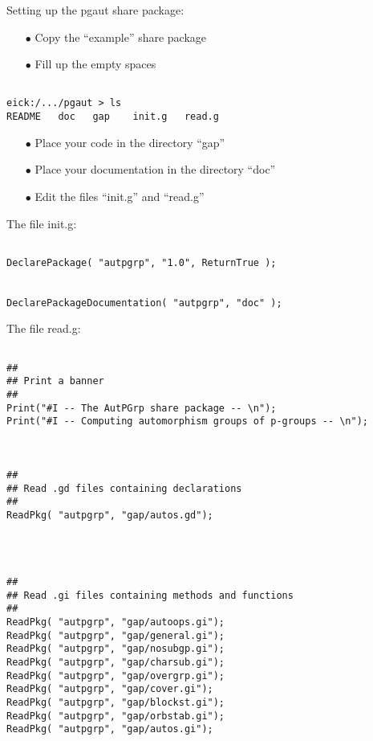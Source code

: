 \documentclass{slides}
\begin{document}
Setting up the pgaut share package: \\

\begin{itemize}
\item[$\bullet$] Copy the ``example'' share package
\item[$\bullet$] Fill up the empty spaces
\end{itemize}

{\tiny \begin{verbatim}

eick:/.../pgaut > ls
README   doc   gap    init.g   read.g

\end{verbatim}}

\begin{itemize}
\item[$\bullet$] Place your code in the directory ``gap''
\item[$\bullet$] Place your documentation in the directory ``doc''
\item[$\bullet$] Edit the files ``init.g'' and ``read.g''
\end{itemize}
\newpage

The file init.g: \\

{\tiny \begin{verbatim}

DeclarePackage( "autpgrp", "1.0", ReturnTrue );


DeclarePackageDocumentation( "autpgrp", "doc" );

\end{verbatim}}
\newpage

The file read.g: \\

{\tiny \begin{verbatim}

##
## Print a banner
##
Print("#I -- The AutPGrp share package -- \n");
Print("#I -- Computing automorphism groups of p-groups -- \n");



##
## Read .gd files containing declarations
##
ReadPkg( "autpgrp", "gap/autos.gd");




##
## Read .gi files containing methods and functions
##
ReadPkg( "autpgrp", "gap/autoops.gi");
ReadPkg( "autpgrp", "gap/general.gi");
ReadPkg( "autpgrp", "gap/nosubgp.gi");
ReadPkg( "autpgrp", "gap/charsub.gi");
ReadPkg( "autpgrp", "gap/overgrp.gi");
ReadPkg( "autpgrp", "gap/cover.gi");
ReadPkg( "autpgrp", "gap/blockst.gi");
ReadPkg( "autpgrp", "gap/orbstab.gi");
ReadPkg( "autpgrp", "gap/autos.gi");

\end{verbatim}}
\newpage
\end{document}
